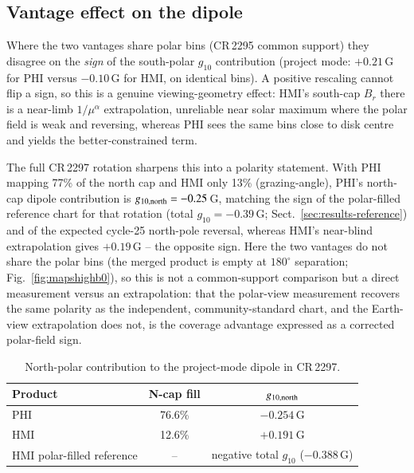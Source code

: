 \documentclass{aa}
\begin{document}
\subsection{Vantage effect on the dipole}
\label{sec:results-sign}

Where the two vantages share polar bins (CR\,2295 common support) they disagree on the \emph{sign} of the south-polar $g_{10}$ contribution (project mode: $+0.21$\,G for PHI versus $-0.10$\,G for HMI, on identical bins). A positive rescaling cannot flip a sign, so this is a genuine viewing-geometry effect: HMI's south-cap $B_r$ there is a near-limb $1/\mu^{\alpha}$ extrapolation, unreliable near solar maximum where the polar field is weak and reversing, whereas PHI sees the same bins close to disk centre and yields the better-constrained term.

The full CR\,2297 rotation sharpens this into a polarity statement. With PHI mapping 77\% of the north cap and HMI only 13\% (grazing-angle), PHI's north-cap dipole contribution is $g_{10,\rm north} = -0.25$\,G, matching the sign of the polar-filled reference chart for that rotation (total $g_{10} = -0.39$\,G; Sect.~\ref{sec:results-reference}) and of the expected cycle-25 north-pole reversal, whereas HMI's near-blind extrapolation gives $+0.19$\,G -- the opposite sign. Here the two vantages do not share the polar bins (the merged product is empty at $180^{\circ}$ separation; Fig.~\ref{fig:mapshighb0}), so this is not a common-support comparison but a direct measurement versus an extrapolation: that the polar-view measurement recovers the same polarity as the independent, community-standard chart, and the Earth-view extrapolation does not, is the coverage advantage expressed as a corrected polar-field sign.

\begin{table}
\caption{North-polar contribution to the project-mode dipole in CR\,2297.}
\label{tab:northsign}
\centering
\footnotesize
\begin{tabular}{lcc}
\hline\hline
Product & N-cap fill & $g_{10,\rm north}$ \\
\hline
PHI & 76.6\% & $-0.254$\,G \\
HMI & 12.6\% & $+0.191$\,G \\
HMI polar-filled reference & -- & negative total $g_{10}$ ($-0.388$\,G) \\
\hline
\end{tabular}
\end{table}
\end{document}
